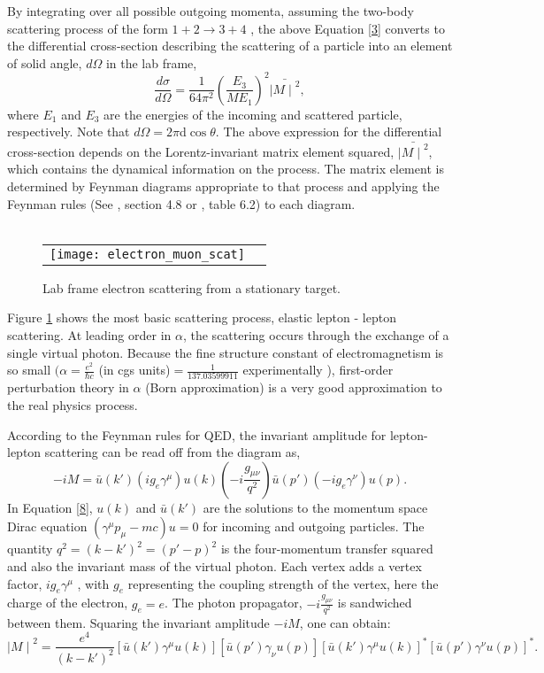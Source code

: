 By integrating over all possible outgoing momenta,  assuming the two-body scattering process of the form $1+2 \rightarrow 3+4$ , the above Equation \eqref{3} converts to the differential cross-section describing the scattering of a particle into an element of solid angle, $d\Omega$ in the lab frame, 
 \begin{equation}
 \label{4}
  \frac{d\sigma}{d\Omega} = \frac{1}{64\pi^2}\left(\frac{E_3}{ME_1}\right)^2 {\bar { {\mid M \mid}^2}},
 \end{equation} 
where $E_1$ and $E_3$ are the energies of the incoming and scattered particle, respectively. Note that $d\Omega =2\pi$d$\cos \theta$. The above expression for the differential cross-section depends on the Lorentz-invariant matrix element squared, ${\bar { {\mid M \mid}^2}}$, which contains the dynamical information on the process. The matrix element is determined by Feynman diagrams appropriate to that process and applying the Feynman rules (See \cite{7}, section 4.8 or \cite{5}, table 6.2) to each diagram. 
\\~
\begin{figure}[htbp]
\centering
\begin{tabular}{cc}
\mbox{\texttt{[image: electron\_muon\_scat]}}
\end{tabular}
\caption{Lab frame electron scattering from a stationary target.}
\label{fig1}
\end{figure}

Figure \ref{fig1} shows the most basic scattering process, elastic  lepton - lepton scattering. At leading order in $\alpha$, the scattering occurs through the exchange of a single virtual photon. Because the fine structure constant of electromagnetism is so small $(\alpha =\frac{e^2}{\hbar c }$ (in cgs units)$=\frac{1}{137.03599911} $ experimentally \cite{8}), first-order perturbation theory in $\alpha$ (Born approximation) is a very good approximation to the real physics process.

According to the Feynman rules for QED, the invariant amplitude for lepton-lepton scattering can be read off from the diagram as,
\begin{equation}
\label{8}
-iM=\bar{u}(k')(ig_e\gamma ^\mu)u(k)\left(-i\frac {g_{\mu \nu}} {q^2} \right)\bar{u}(p')(-ig_e\gamma ^\nu) u(p).
\end{equation}
In Equation \eqref{8}, $u(k)$ and $\bar {u}(k')$ are the solutions to the momentum space Dirac equation $(\gamma ^\mu p_\mu -mc)u=0$ for incoming and outgoing particles. The quantity $q^2=(k-k')^2=(p'-p)^2$ is the four-momentum transfer squared and also the invariant mass of the virtual photon. Each vertex adds a vertex factor, $ig_e \gamma ^\mu$ , with $g_e$ representing the coupling strength of the vertex, here the charge of the electron, $g_e=e$. The photon propagator, $-i\frac {g_{\mu \nu}}{q^2}$ is sandwiched between them.
Squaring the invariant amplitude $-iM$, one can obtain:
\begin{equation}
\label{9}
{\mid M \mid }^2=\frac {e^4}{(k-k')^2} [\bar {u}(k') \gamma ^\mu u(k)][\bar {u}(p') \gamma_\nu u(p)][\bar{u}(k') \gamma^\mu u(k)]^*[\bar{u}(p')\gamma^\nu u(p)]^*.
\end {equation}

